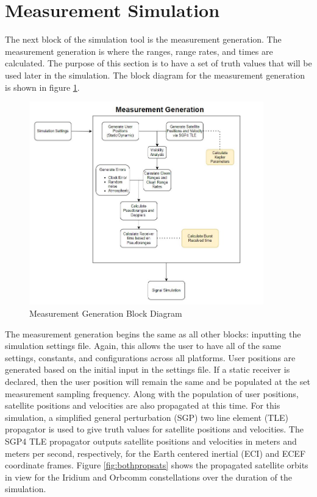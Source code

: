 \documentclass[12pt]{report}
\begin{document}
\section{Measurement Simulation}
The next block of the simulation tool is the measurement generation. The measurement generation is where the ranges, range rates, and times are calculated. The purpose of this section is to have a set of truth values that will be used later in the simulation. The block diagram for the measurement generation is shown in figure \ref{fig:MeasBlock}.

\begin{figure}[ht]
    \centering
    \includegraphics[width=4in]{MeasurementGenBlockDiagram}
    \caption{Measurement Generation Block Diagram}
    \label{fig:MeasBlock}
\end{figure}

The measurement generation begins the same as all  other blocks: inputting the simulation settings file. Again, this allows the user to have all of the same settings, constants, and configurations across all platforms. User positions are generated based on the initial input in the settings file. If a static receiver is declared, then the user position will remain the same and be populated at the set measurement sampling frequency. Along with the population of user positions, satellite positions and velocities are also propagated at this time. For this simulation, a simplified general perturbation (SGP) two line element (TLE) propagator is used to give truth values for satellite positions and velocities. The SGP4 TLE propagator outputs satellite positions and velocities in meters and meters per second, respectively, for the Earth centered inertial (ECI) and ECEF coordinate frames. Figure \ref{fig:bothpropsats} shows the propagated satellite orbits in view for the Iridium and Orbcomm constellations over the duration of the simulation. 
\end{document}
